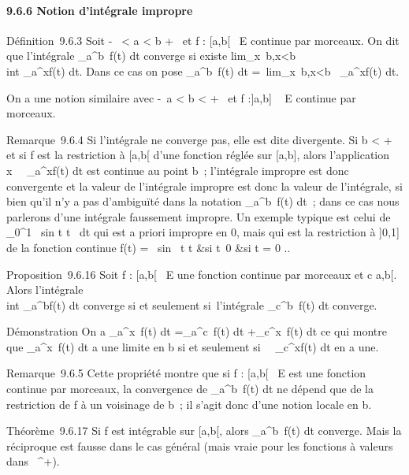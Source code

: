 \documentclass[]{article}
\begin{document}
\paragraph{9.6.6 Notion d'intégrale impropre}

Définition~9.6.3 Soit -\infty~ \textless{} a \textless{} b \leq +\infty~ et f :
{[}a,b{[}\rightarrow~ E continue par morceaux. On dit que l'intégrale
\int  _a^b~f(t) dt converge si
existe
lim_x\rightarrow~b,x\textless{}b~\\int
 _a^xf(t) dt. Dans ce cas on pose
\int  _a^b~f(t) dt
=\
lim_x\rightarrow~b,x\textless{}b\int ~
_a^xf(t) dt.

On a une notion similaire avec -\infty~\leq a \textless{} b \textless{} +\infty~ et f
:{]}a,b{]} \rightarrow~ E continue par morceaux.

Remarque~9.6.4 Si l'intégrale ne converge pas, elle est dite divergente.
Si b \textless{} +\infty~ et si f est la restriction à {[}a,b{[} d'une
fonction réglée sur {[}a,b{]}, alors l'application
x\mapsto~\int ~
_a^xf(t) dt est continue au point b~; l'intégrale impropre
est donc convergente et la valeur de l'intégrale impropre est donc la
valeur de l'intégrale, si bien qu'il n'y a pas d'ambiguïté dans la
notation \int  _a^b~f(t) dt~; dans
ce cas nous parlerons d'une intégrale faussement impropre. Un exemple
typique est celui de \int  _0^1~
sin t \over t~ dt qui est a
priori impropre en 0, mais qui est la restriction à {]}0,1{]} de la
fonction continue f(t) = \left \
\cases  sin~ t
\over t &si t\neq~0
 &si t = 0 \cr 
\right ..

Proposition~9.6.16 Soit f : {[}a,b{[}\rightarrow~ E une fonction continue par
morceaux et c \in {[}a,b{[}. Alors l'intégrale \\int
 _a^bf(t) dt converge si et seulement si~l'intégrale
\int  _c^b~f(t) dt converge.

Démonstration On a \int  _a^x~f(t)
dt =\int  _a^c~f(t) dt
+\int  _c^x~f(t) dt ce qui montre
que \int  _a^x~f(t) dt a une
limite en b si et seulement si~\int ~
_c^xf(t) dt en a une.

Remarque~9.6.5 Cette propriété montre que si f : {[}a,b{[}\rightarrow~ E est une
fonction continue par morceaux, la convergence de
\int  _a^b~f(t) dt ne dépend que
de la restriction de f à un voisinage de b~; il s'agit donc d'une notion
locale en b.

Théorème~9.6.17 Si f est intégrable sur {[}a,b{[}, alors
\int  _a^b~f(t) dt converge. Mais
la réciproque est fausse dans le cas général (mais vraie pour les
fonctions à valeurs dans ~^+).
\end{document}
